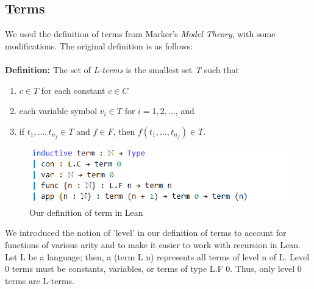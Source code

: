 \documentclass[landscape]{sciposter}
\begin{document}
\begin{multicols}{4}
\section*{Terms}

We used the definition of terms from Marker's \textit{Model Theory}, with some modifications. The original definition is as follows: \\ \\
\textbf{Definition:} The set of \textit{L-terms} is the smallest set \textit{T} such that
\renewcommand{\labelenumi}{\roman{enumi}) }
\begin{enumerate}
    \item $c\in T$ for each constant $c\in C$
    \item each variable symbol $v_i\in T$ for $i=1,2,...$, and
    \item if $t_1,...,t_{n_f}\in T$ and $f\in F$, then $f(t_1,...,t_{n_f})\in T$.
\end{enumerate}


\begin{center}\begin{figure}
\includegraphics[height=2 in]{termsLean.PNG}
 	\caption{Our definition of term in Lean}

\end{figure}\end{center}

We introduced the notion of 'level' in our definition of terms to account for
functions of various arity and to make it easier to work with recursion in Lean. Let L be a language; then, a (term L n) represents all terms of level n of L. Level 0 terms must be constants, variables, or terms of type L.F 0. Thus, only level 0 terms are L-terms.


\end{multicols}
\end{document}
